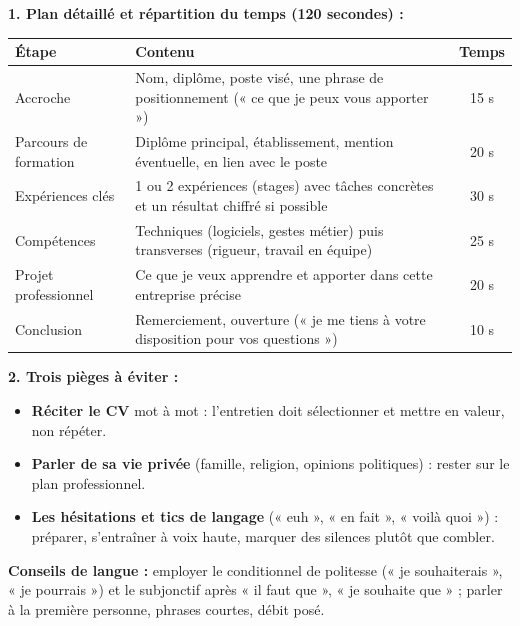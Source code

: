 \documentclass[11pt]{article}
\begin{document}
\begin{corrige}
\textbf{1. Plan détaillé et répartition du temps (120 secondes) :}
\begin{center}
\begin{tabularx}{\linewidth}{|l|X|c|}
\hline
\rowcolor{popblueL} \textbf{Étape} & \textbf{Contenu} & \textbf{Temps} \\
\hline
Accroche & Nom, diplôme, poste visé, une phrase de positionnement (« ce que je peux vous apporter ») & 15 s \\
\hline
Parcours de formation & Diplôme principal, établissement, mention éventuelle, en lien avec le poste & 20 s \\
\hline
Expériences clés & 1 ou 2 expériences (stages) avec tâches concrètes et un résultat chiffré si possible & 30 s \\
\hline
Compétences & Techniques (logiciels, gestes métier) puis transverses (rigueur, travail en équipe) & 25 s \\
\hline
Projet professionnel & Ce que je veux apprendre et apporter dans cette entreprise précise & 20 s \\
\hline
Conclusion & Remerciement, ouverture (« je me tiens à votre disposition pour vos questions ») & 10 s \\
\hline
\end{tabularx}
\end{center}

\textbf{2. Trois pièges à éviter :}
\begin{itemize}
\item \textbf{Réciter le CV} mot à mot : l'entretien doit sélectionner et mettre en valeur, non répéter.
\item \textbf{Parler de sa vie privée} (famille, religion, opinions politiques) : rester sur le plan professionnel.
\item \textbf{Les hésitations et tics de langage} (« euh », « en fait », « voilà quoi ») : préparer, s'entraîner à voix haute, marquer des silences plutôt que combler.
\end{itemize}

\textbf{Conseils de langue :} employer le conditionnel de politesse (« je souhaiterais », « je pourrais ») et le subjonctif après « il faut que », « je souhaite que » ; parler à la première personne, phrases courtes, débit posé.
\end{corrige}
\end{document}
